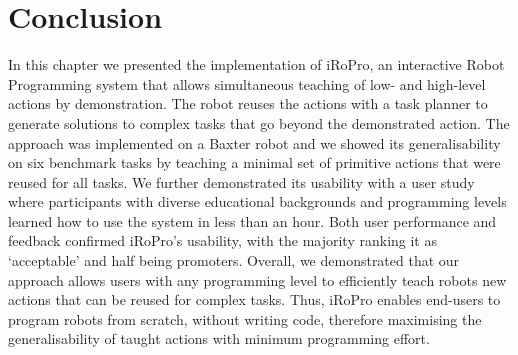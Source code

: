 \section{Conclusion} 
\label{sec:conclusion}
In this chapter we presented the implementation of iRoPro, an interactive Robot Programming system that allows simultaneous teaching of low- and high-level actions by demonstration.
The robot reuses the actions with a task planner to generate solutions to complex tasks that go beyond the demonstrated action.
The approach was implemented on a Baxter robot and we showed its generalisability on six benchmark tasks by teaching a minimal set of primitive actions that were reused for all tasks.
We further demonstrated its usability with a user study where participants with diverse educational backgrounds and programming levels learned how to use the system in less than an hour.
Both user performance and feedback confirmed iRoPro's usability, with the majority ranking it as `acceptable' and half being promoters.
Overall, we demonstrated that our approach allows users with any programming level to efficiently teach robots new actions that can be reused for complex tasks.
Thus, iRoPro enables end-users to program robots from scratch, without writing code, therefore maximising the generalisability of taught actions with minimum programming effort.